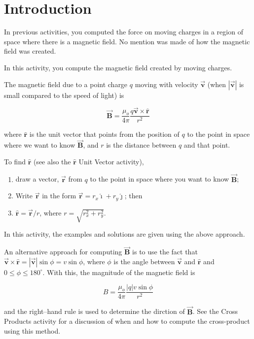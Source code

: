 \documentclass{article}
\newcommand{\ihat}[0]{\hat{\boldsymbol{\imath}}}
\newcommand{\jhat}[0]{\hat{\boldsymbol{\jmath}}}
\newcommand{\rhat}[0]{\hat{\mathbf{r}}}
\newcommand{\bfvec}[1]{\vec{\mathbf{#1}}}
\begin{document}
\section{Introduction}

In previous activities, you computed the force on moving charges in a region of space where there is a magnetic field. No mention was made of how the magnetic field was created.

In this activity, you compute the magnetic field created by moving charges.

The magnetic field due to a point charge $q$ moving with velocity $\bfvec{v}$ (when $|\bfvec{v}|$ is small compared to the speed of light) is

$$
\bfvec{B} = \frac{\mu_o}{4\pi}\frac{q\bfvec{v}\times\hat{\mathbf{r}}}{r^2}
$$

where $\rhat$ is the unit vector that points from the position of $q$ to the point in space where we want to know $\bfvec{B}$, and $r$ is the distance between $q$ and that point.

To find $\rhat$ (see also the $\rhat$ Unit Vector activity), 

\begin{enumerate}

  \item draw a vector, $\bfvec{r}$ from $q$ to the point in space where you want to know $\bfvec{B}$;

  \item Write $\bfvec{r}$ in the form $\bfvec{r}=r_x\ihat+r_y\jhat$; then

  \item $\rhat=\bfvec{r}/r$, where $r=\sqrt{r_x^2+r_y^2}$.

\end{enumerate}

In this activity, the examples and solutions are given using the above approach.

An alternative approach for computing $\bfvec{B}$ is to use the fact that $\bfvec{v}\times\hat{\mathbf{r}}=|\bfvec{v}|\sin\phi=v\sin\phi$, where $\phi$ is the angle between $\bfvec{v}$ and $\hat{\mathbf{r}}$ and $0 \le\phi \le 180^{\circ}$. With this, the magnitude of the magnetic field is

$$
B = \frac{\mu_o}{4\pi}\frac{|q|v\sin\phi}{r^2}
$$

and the right--hand rule is used to determine the dirction of $\bfvec{B}$. See the Cross Products activity for a discussion of when and how to compute the cross-product using this method.
\end{document}
